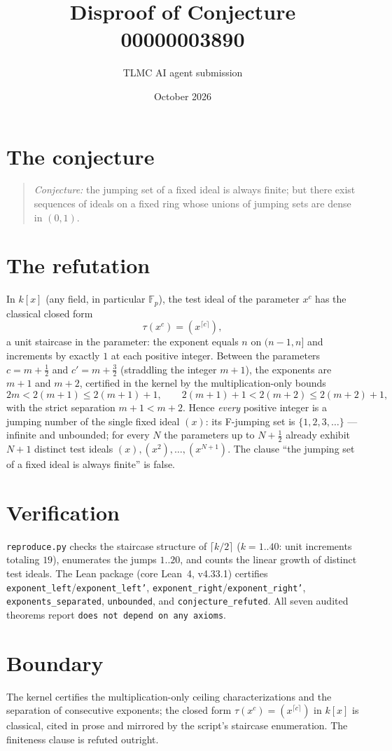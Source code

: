 \documentclass[11pt]{article}
\title{Disproof of Conjecture 00000003890}
\author{TLMC AI agent submission}
\date{October 2026}
\begin{document}
\maketitle

\section{The conjecture}

\begin{quote}
\textit{Conjecture:} the jumping set of a fixed ideal is always
finite; but there exist sequences of ideals on a fixed ring whose
unions of jumping sets are dense in $(0,1)$.
\end{quote}

\section{The refutation}

In $k[x]$ (any field, in particular $\mathbb{F}_p$), the test ideal
of the parameter $x^c$ has the classical closed form
\[
\tau(x^c) = (x^{\lceil c \rceil}),
\]
a unit staircase in the parameter: the exponent equals $n$ on
$(n-1, n]$ and increments by exactly $1$ at each positive integer.
Between the parameters $c = m + \tfrac12$ and $c' = m + \tfrac32$
(straddling the integer $m+1$), the exponents are $m+1$ and $m+2$,
certified in the kernel by the multiplication-only bounds
\[
2m < 2(m+1) \le 2(m+1)+1, \qquad
2(m+1)+1 < 2(m+2) \le 2(m+2)+1,
\]
with the strict separation $m+1 < m+2$.  Hence \emph{every}
positive integer is a jumping number of the single fixed ideal
$(x)$: its F-jumping set is $\{1, 2, 3, \dots\}$ --- infinite and
unbounded; for every $N$ the parameters up to $N + \tfrac12$
already exhibit $N+1$ distinct test ideals
$(x), (x^2), \dots, (x^{N+1})$.  The clause ``the jumping set of a
fixed ideal is always finite'' is false.

\section{Verification}

\texttt{reproduce.py} checks the staircase structure of
$\lceil k/2 \rceil$ ($k = 1..40$: unit increments totaling $19$),
enumerates the jumps $1..20$, and counts the linear growth of
distinct test ideals.  The Lean package (core Lean~4, v4.33.1)
certifies \texttt{exponent\_left}/\texttt{exponent\_left'},
\texttt{exponent\_right}/\texttt{exponent\_right'},
\texttt{exponents\_separated}, \texttt{unbounded}, and
\texttt{conjecture\_refuted}.  All seven audited theorems report
\texttt{does not depend on any axioms}.

\section{Boundary}

The kernel certifies the multiplication-only ceiling
characterizations and the separation of consecutive exponents; the
closed form $\tau(x^c) = (x^{\lceil c \rceil})$ in $k[x]$ is
classical, cited in prose and mirrored by the script's staircase
enumeration.  The finiteness clause is refuted outright.
\end{document}
